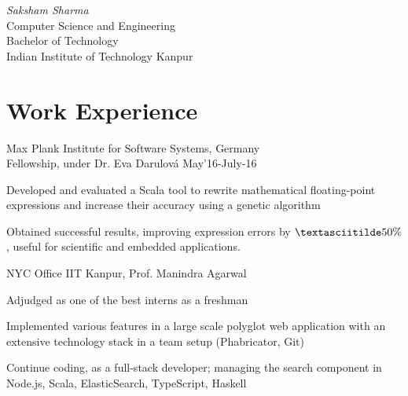 \documentclass{tccv}
\begin{document}
{ \textit{Saksham \textcolor{myred}{Sharma}}}
\medskip\\
\large{Computer Science and Engineering}\\
\large{Bachelor of Technology}\\
{Indian Institute of Technology Kanpur}

\vspace{-0.5cm}
\section{Work Experience}
\vspace{-0.1cm}
\begin{experience}

  {Max Plank Institute for Software Systems, \small{Germany}\\
  Fellowship, under Dr. Eva Darulová \hfill May'16-July-16}
  {
  \item Developed and evaluated a Scala tool to rewrite
    mathematical floating-point expressions and increase their
    accuracy using a genetic algorithm
  \item Obtained successful results, improving expression errors by
    $\textasciitilde50\%$, useful for scientific and embedded
    applications.
  }

  {NYC Office IIT Kanpur, Prof. Manindra Agarwal}
  {
  \item Adjudged as one of the best interns as a freshman
  \item Implemented various features in a large scale polyglot web
    application with an extensive technology stack in a team setup
    (Phabricator, Git)
  \item Continue coding, as a full-stack developer;
    managing the search component in Node.js, Scala, ElasticSearch,
    TypeScript, Haskell
  }
\end{experience}

\vspace{-0.5cm}
\end{document}
